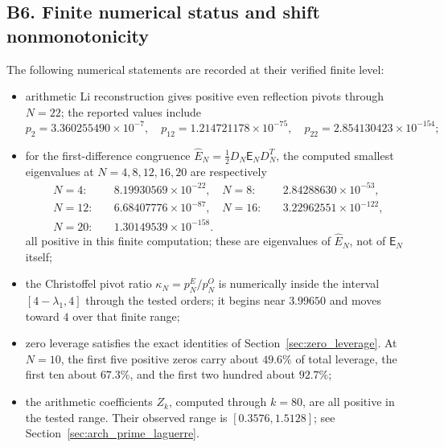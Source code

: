 \documentclass[11pt]{amsart}
\numberwithin{equation}{section}
\theoremstyle{plain}
\theoremstyle{definition}
\theoremstyle{remark}
\newcommand{\E}{\mathsf E}
\begin{document}
\subsection{B6. Finite numerical status and shift nonmonotonicity}
\label{subsec:routeB_numerics}

The following numerical statements are recorded at their verified finite level:
\begin{itemize}
\item arithmetic Li reconstruction gives positive even reflection pivots through \(N=22\); the
reported values include
\[
p_2=3.360255490\times10^{-7},\quad
p_{12}=1.214721178\times10^{-75},\quad
p_{22}=2.854130423\times10^{-154};
\]
\item for the first-difference congruence
\(\widehat E_N=\tfrac12D_N\E_ND_N^T\), the computed smallest eigenvalues at
\(N=4,8,12,16,20\) are respectively
\begin{align*}
N=4:&\quad 8.19930569\times10^{-22},&
N=8:&\quad 2.84288630\times10^{-53},\\
N=12:&\quad 6.68407776\times10^{-87},&
N=16:&\quad 3.22962551\times10^{-122},\\
N=20:&\quad 1.30149539\times10^{-158}.&&
\end{align*}
all positive in this finite computation; these are eigenvalues of \(\widehat E_N\), not of
\(\E_N\) itself;
\item the Christoffel pivot ratio \(\kappa_N=p_N^E/p_N^O\) is numerically inside the interval
\([4-\lambda_1,4]\) through the tested orders; it begins near \(3.99650\) and moves toward \(4\) over that finite range;
\item zero leverage satisfies the exact identities of Section~\ref{sec:zero_leverage}.  At \(N=10\),
the first five positive zeros carry about \(49.6\%\) of total leverage, the first ten about
\(67.3\%\), and the first two hundred about \(92.7\%\);
\item the arithmetic coefficients \(Z_k\), computed through \(k=80\), are all positive in the tested
range.  Their observed range is \([0.3576,1.5128]\); see
Section~\ref{sec:arch_prime_laguerre}.
\end{itemize}
\end{document}
